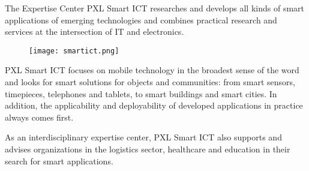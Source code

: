 
The Expertise Center PXL Smart ICT researches and develops all kinds of smart applications of emerging technologies and combines practical research and services at the intersection of IT and electronics.

\begin{figure}[ht]
    \centering
    \texttt{[image: smartict.png]}
\end{figure} 

PXL Smart ICT focuses on mobile technology in the broadest sense of the word and looks for smart solutions for objects and communities: from smart sensors, timepieces, telephones and tablets, to smart buildings and smart cities. In addition, the applicability and deployability of developed applications in practice always comes first.

As an interdisciplinary expertise center, PXL Smart ICT also supports and advises organizations in the logistics sector, healthcare and education in their search for smart applications.